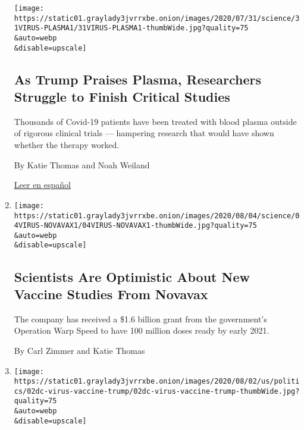 \begin{enumerate}
  \texttt{[image: https://static01.graylady3jvrrxbe.onion/images/2020/07/31/science/31VIRUS-PLASMA1/31VIRUS-PLASMA1-thumbWide.jpg?quality=75\\\&auto=webp\\\&disable=upscale]}

  \hypertarget{as-trump-praises-plasma-researchers-struggle-to-finish-critical-studies}{%
  \subsection{As Trump Praises Plasma, Researchers Struggle to Finish
  Critical
  Studies}\label{as-trump-praises-plasma-researchers-struggle-to-finish-critical-studies}}

  Thousands of Covid-19 patients have been treated with blood plasma
  outside of rigorous clinical trials --- hampering research that would
  have shown whether the therapy worked.

  By Katie Thomas and Noah Weiland

  \href{https://www.nytimes3xbfgragh.onion/es/2020/08/07/espanol/ciencia-y-tecnologia/plasma-convaleciente-coronavirus.html}{Leer
  en español}
\item
  \href{/2020/08/04/health/covid-19-vaccine-novavax.html}{}

  \texttt{[image: https://static01.graylady3jvrrxbe.onion/images/2020/08/04/science/04VIRUS-NOVAVAX1/04VIRUS-NOVAVAX1-thumbWide.jpg?quality=75\\\&auto=webp\\\&disable=upscale]}

  \hypertarget{scientists-are-optimistic-about-new-vaccine-studies-from-novavax}{%
  \subsection{Scientists Are Optimistic About New Vaccine Studies From
  Novavax}\label{scientists-are-optimistic-about-new-vaccine-studies-from-novavax}}

  The company has received a \$1.6 billion grant from the government's
  Operation Warp Speed to have 100 million doses ready by early 2021.

  By Carl Zimmer and Katie Thomas
\item
  \href{/2020/08/02/us/politics/coronavirus-vaccine.html}{}

  \texttt{[image: https://static01.graylady3jvrrxbe.onion/images/2020/08/02/us/politics/02dc-virus-vaccine-trump/02dc-virus-vaccine-trump-thumbWide.jpg?quality=75\\\&auto=webp\\\&disable=upscale]}

  \hypertarget{scientists-worry-about-political-influence-over-coronavirus-vaccine-project}{%
}
\end{enumerate}
